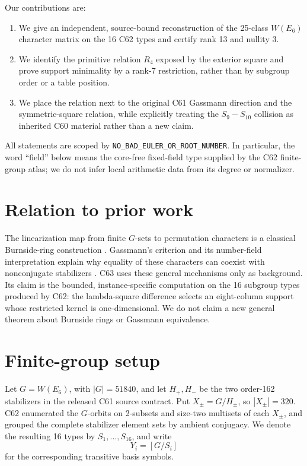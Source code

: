 \documentclass[11pt]{article}
\newcommand{\G}{G}
\begin{document}
Our contributions are:
\begin{enumerate}[leftmargin=*,itemsep=2pt]
\item We give an independent, source-bound reconstruction of the 25-class
  \(W(E_6)\) character matrix on the 16 C62 types and certify rank 13 and
  nullity 3.
\item We identify the primitive relation \(R_4\) exposed by the exterior
  square and prove support minimality by a rank-7 restriction, rather than by
  subgroup order or a table position.
\item We place the relation next to the original C61 Gassmann direction and
  the symmetric-square relation, while explicitly treating the \(S_9-S_{10}\)
  collision as inherited C60 material rather than a new claim.
\end{enumerate}

All statements are scoped by
\texttt{NO\_BAD\_EULER\_OR\_ROOT\_NUMBER}.  In particular, the word
``field'' below means the core-free fixed-field type supplied by the C62
finite-group atlas; we do not infer local arithmetic data from its degree or
normalizer.

\section{Relation to prior work}
The linearization map from finite \(G\)-sets to permutation characters is a
classical Burnside-ring construction \citep{burnside1911}.  Gassmann's
criterion and its number-field interpretation explain why equality of these
characters can coexist with nonconjugate stabilizers
\citep{gassmann1926,perlis1977}.  C63 uses these general mechanisms only as
background.  Its claim is the bounded, instance-specific computation on the
16 subgroup types produced by C62: the lambda-square difference selects an
eight-column support whose restricted kernel is one-dimensional.  We do not
claim a new general theorem about Burnside rings or Gassmann equivalence.

\section{Finite-group setup}
Let \(\G=W(E_6)\), with \(|\G|=51840\), and let \(H_+,H_-\) be the two
order-162 stabilizers in the released C61 source contract.  Put
\(X_\pm=\G/H_\pm\), so \(|X_\pm|=320\).  C62 enumerated the \(G\)-orbits on
2-subsets and size-two multisets of each \(X_\pm\), and grouped the complete
stabilizer element sets by ambient conjugacy.  We denote the resulting 16
types by \(S_1,\ldots,S_{16}\), and write
\[
Y_i=[\G/S_i]
\]
for the corresponding transitive basis symbols.
\end{document}
